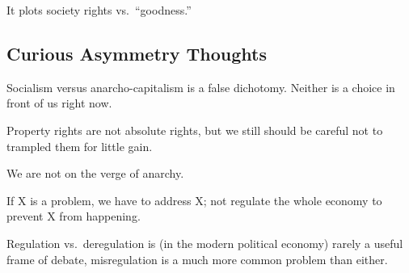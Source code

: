 It plots society rights vs.\ ``goodness.''

\subsection{Curious Asymmetry Thoughts}

\thought Socialism versus anarcho-capitalism is a false dichotomy. Neither is a
choice in front of us right now.

\thought Property rights are not absolute rights, but we still should be
careful not to trampled them for little gain.

\thought We are not on the verge of anarchy.

\thought If X is a problem, we have to address X; not regulate the whole
economy to prevent X from happening.

\thought Regulation vs.\ deregulation is (in the modern political economy)
rarely a useful frame of debate, misregulation is a much more common problem
than either.


